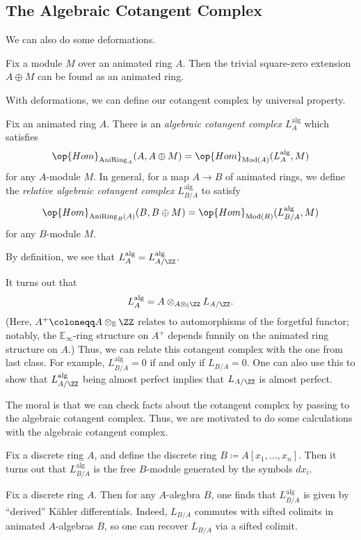 \documentclass[../notes.tex]{subfiles}
\begin{document}
\subsection{The Algebraic Cotangent Complex}
We can also do some deformations.
\begin{example}
	Fix a module $M$ over an animated ring $A$. Then the trivial square-zero extension $A\oplus M$ can be found as an animated ring.
\end{example}
With deformations, we can define our cotangent complex by universal property.
\begin{definition}
	Fix an animated ring $A$. There is an \textit{algebraic cotangent complex $L_A^{\mathrm{alg}}$} which satisfies
	\[\op{Hom}_{\mathrm{AniRing}_A}(A,A\oplus M)=\op{Hom}_{\mathrm{Mod}(A)}(L_A^{\mathrm{alg}},M)\]
	for any $A$-module $M$. In general, for a map $A\to B$ of animated rings, we define the \textit{relative algebraic cotangent complex} $L_{B/A}^{\mathrm{alg}}$ to satisfy
	\[\op{Hom}_{\mathrm{AniRing}_B(A)}(B,B\oplus M)=\op{Hom}_{\mathrm{Mod}(B)}(L_{B/A}^{\mathrm{alg}},M)\]
	for any $B$-module $M$.
\end{definition}
\begin{remark}
	By definition, we see that $L_A^{\mathrm{alg}}=L_{A/\ZZ}^{\mathrm{alg}}$.
\end{remark}
\begin{remark}
	It turns out that
	\[L_A^{\mathrm{alg}}=A\otimes_{A\otimes_{\mathbb S}\ZZ}L_{A/\ZZ}.\]
	(Here, $A^+\coloneqq A\otimes_{\mathbb S}\ZZ$ relates to automorphisms of the forgetful functor; notably, the $\mathbb E_\infty$-ring structure on $A^+$ depends funnily on the animated ring structure on $A$.) Thus, we can relate this cotangent complex with the one from last class. For example, $L_{B/A}^{\mathrm{alg}}=0$ if and only if $L_{B/A}=0$. One can also use this to show that $L_{A/\ZZ}^{\mathrm{alg}}$ being almost perfect implies that $L_{A/\ZZ}$ is almost perfect.
\end{remark}
The moral is that we can check facts about the cotangent complex by passing to the algebraic cotangent complex. Thus, we are motivated to do some calculations with the algebraic cotangent complex.
\begin{example}
	Fix a discrete ring $A$, and define the discrete ring $B\coloneqq A[x_1,\ldots,x_n]$. Then it turns out that $L_{B/A}^{\mathrm{alg}}$ is the free $B$-module generated by the symbols $dx_i$.
\end{example}
\begin{example}
	Fix a discrete ring $A$. Then for any $A$-alegbra $B$, one finds that $L_{B/A}^{\mathrm{alg}}$ is given by ``derived'' K\"ahler differentials. Indeed, $L_{B/A}$ commutes with sifted colimits in animated $A$-algebras $B$, so one can recover $L_{B/A}$ via a sifted colimit.
\end{example}
\end{document}
